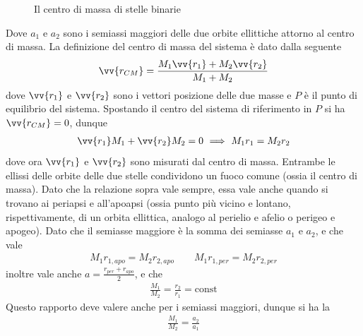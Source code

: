 \documentclass[a4paper, oneside]{book}
\begin{document}
\noindent
\begin{figure}
    \centering
    \caption{Il centro di massa di stelle binarie}
\end{figure}
Dove $a_1$ e $a_2$ sono i semiassi maggiori delle due orbite ellittiche attorno al centro di massa. 
La definizione del centro di massa del sistema è dato dalla seguente 
\begin{align}
    \vv{r_{CM}} = \frac{M_1 \vv{r_1} + M_2 \vv{r_2}  }{M_1 + M_2}
\end{align}
dove $\vv{r_1}$ e $\vv{r_2}$ sono i vettori posizione delle due masse e $P$ è il punto di 
equilibrio del sistema. Spostando il centro del sistema di riferimento in $P$ si ha $\vv{r_{CM}} = 0$, dunque 
\begin{gather*}
    \vv{r_1}M_1 + \vv{r_2}M_2 = 0 \ \Longrightarrow \  M_1 r_1 = M_2 r_2 
\end{gather*}
dove ora $\vv{r_1}$ e $\vv{r_2}$ sono misurati dal centro di massa. Entrambe le ellissi delle orbite delle due stelle condividono un fuoco comune (ossia il centro di massa).
Dato che la relazione sopra vale sempre, essa vale anche quando si trovano ai periapsi e all'apoapsi  (ossia 
punto più vicino e lontano, rispettivamente, di un orbita ellittica, analogo al perielio e afelio o perigeo e apogeo).
Dato che il semiasse maggiore è la somma dei semiasse $a_1$ e $a_2$, e che vale
\begin{gather*}
    M_1 r_{1, apo} = M_2 r_{2, apo} \qquad M_1 r_{1, per} = M_2 r_{2, per}
\end{gather*}
inoltre vale anche $a = \frac{r_{per} + r_{apo}}{2}$, e che
\begin{gather*}
    \frac{M_1}{M_2} = \frac{r_2}{r_1} = \text{const}
\end{gather*}
Questo rapporto deve valere anche per i semiassi maggiori, dunque si ha la
\begin{gather*}
    \frac{M_1}{M_2} = \frac{a_2}{a_1}
\end{gather*}
\end{document}
